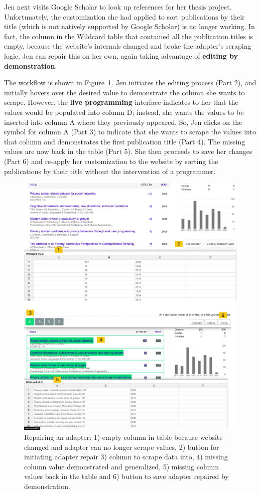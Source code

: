 \documentclass[sigconf,10pt]{acmart}
\begin{document}
Jen next visits Google Scholar to look up references for her thesis
project. Unfortunately, the customization she had applied to sort
publications by their title (which is not natively supported by Google
Scholar) is no longer working. In fact, the column in the Wildcard table
that contained all the publication titles is empty, because the
website's internals changed and broke the adapter's scraping logic. Jen
can repair this on her own, again taking advantage of \textbf{editing by
demonstration}.

The workflow is shown in Figure~\ref{fig:repairing}. Jen initiates the
editing process (Part 2), and initially hovers over the desired value to
demonstrate the column she wants to scrape. However, the \textbf{live
programming} interface indicates to her that the values would be
populated into column D; instead, she wants the values to be inserted
into column A where they previously appeared. So, Jen clicks on the
symbol for column A (Part 3) to indicate that she wants to scrape the
values into that column and demonstrates the first publication title
(Part 4). The missing values are now back in the table (Part 5). She
then proceeds to save her changes (Part 6) and re-apply her
customization to the website by sorting the publications by their title
without the intervention of a programmer.

\begin{figure}
  \includegraphics[width=\textwidth]{media/repairing.png}
  \caption{\label{fig:repairing} Repairing an adapter: 1) empty column in table because website changed and adapter can no longer scrape values, 2) button for initiating adapter repair 3) column to scrape data into, 4) missing column value demonstrated and generalized, 5) missing column values back in the table and 6) button to save adapter repaired by demonstration.}
\end{figure}
\end{document}
